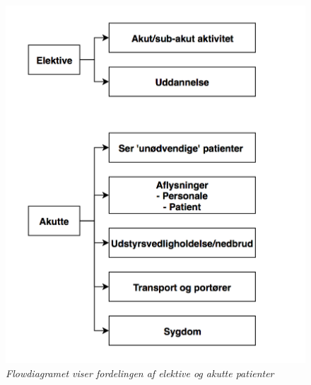 \begin{figure}[H]
	\flushleft 
	\centering
	\includegraphics[scale=.45]{figures/planlagtakutte.png}
	\label{planlagtakutte}
	\flushleft
	\textit{Flowdiagramet viser fordelingen af elektive og akutte patienter\cite{Company2013}}
\end{figure}